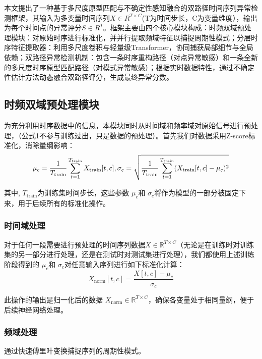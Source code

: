 \documentclass{setp-new}
\begin{document}
本文提出了一种基于多尺度原型匹配与不确定性感知融合的双路径时间序列异常检测框架，其输入为多变量时间序列\(X \in R^{T \times C}\)(T为时间步长，C为变量维度），输出为每个时间点的异常评分\(S \in R^{T}\)。框架主要由四个核心模块构成：时频双域预处理模块：对原始时序进行标准化，并并行提取频域特征以捕捉周期性模式；分层时序特征提取器：利用多尺度卷积与轻量级Transformer，协同捕获局部细节与全局依赖；双路径异常检测机制：包含一条时序重构路径（对点异常敏感）和一条全新的多尺度时序原型匹配路径（对模式异常敏感）；根据实时数据特性，通过不确定性估计方法动态融合双路径评分，生成最终异常分数。

\subsection{时频双域预处理模块}

为充分利用时序数据中的信息，本模块同时从时间域和频率域对原始信号进行预处理，（公式1不参与训练过出，只是数据的预处理）。首先我们对数据采用Z-score标准化，消除量纲影响：
\begin{equation}
\mu_c = \frac{1}{T_{\text{train}}} \sum_{t=1}^{T_{\text{train}}} X_{\text{train}}[t,c]\\,
\sigma_c = \sqrt{\frac{1}{T_{\text{train}}} \sum_{t=1}^{T_{\text{train}}} (X_{\text{train}}[t,c] - \mu_c)^2}
\end{equation}

其中, $T_{\text{train}}$为训练集时间步长，这些参数 $\mu_c$和 $\sigma_c$将作为模型的一部分被固定下来，用于后续所有的标准化操作。

\subsubsection{时间域处理}
对于任何一段需要进行预处理的时间序列数据$X \in \mathbb{R}^{T \times C}$（无论是在训练时对训练集的另一部分进行处理，还是在测试时对测试集进行处理），我们都使用上述训练阶段得到的 $\mu_c$和 $\sigma_c$对任意输入序列进行如下标准化计算：
\begin{equation}
X_{\text{norm}}[t,c] = \frac{X[t,c] - \mu_c}{\sigma_c}
\end{equation}

此操作的输出是归一化后的数据 $X_{\text{norm}} \in \mathbb{R}^{T \times C}$，确保各变量处于相同量纲，便于后续神经网络处理。

\subsubsection{频域处理}
通过快速傅里叶变换捕捉序列的周期性模式。
\end{document}
